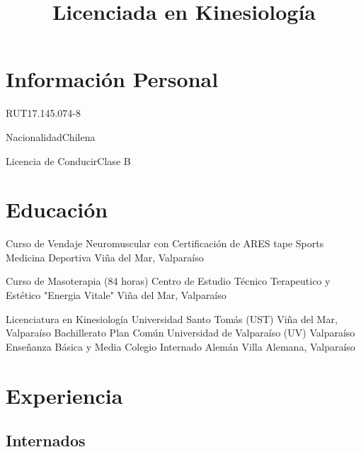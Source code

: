 \documentclass[11pt,a4paper,sans]{moderncv}
\title{Licenciada en Kinesiología}
\begin{document}
\maketitle

\section{Información Personal}

	   {RUT}{17.145.074-8}

	   {Nacionalidad}{Chilena}

	   {Licencia de Conducir}{Clase B}
	   
\section{Educación}

        {Curso de Vendaje Neuromuscular con Certificación de ARES tape}
        {Sports Medicina Deportiva}
        {Viña del Mar, Valparaíso}
        {}
        {}

        {Curso de Masoterapia (84 horas)}
        {Centro de Estudio Técnico Terapeutico y Estético "Energia Vitale"}
        {Viña del Mar, Valparaíso}
        {}
        {}

        {Licenciatura en Kinesiología}
        {Universidad Santo Tomás (UST)}
        {Viña del Mar, Valparaíso}
        {}
        {}
        {Bachillerato Plan Común}
        {Universidad de Valparaíso (UV)}
        {Valparaíso}
        {}
        {}
        {Enseñanza Básica y Media}
        {Colegio Internado Alemán}
        {Villa Alemana, Valparaíso}
        {}{}

\section{Experiencia}
\subsection{Internados}
        
\end{document}
